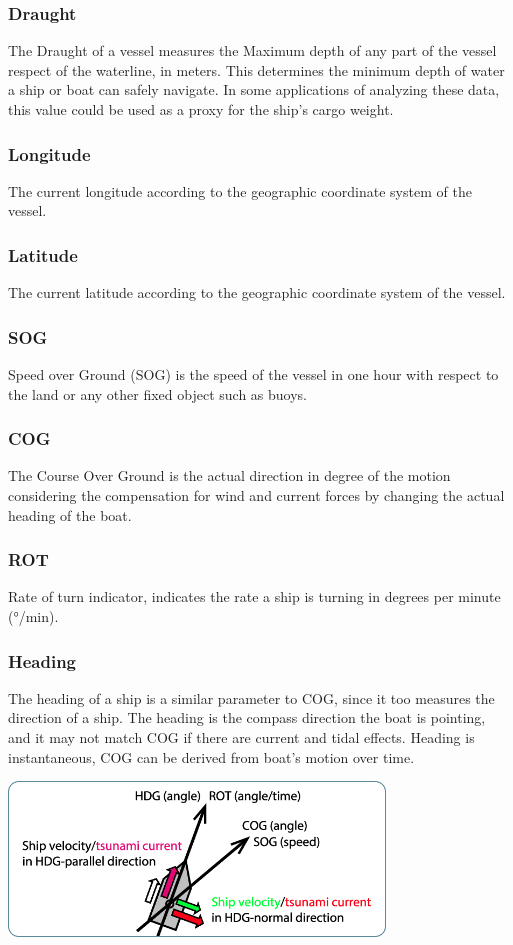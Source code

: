 \subsubsection{Draught}
    The Draught of a vessel measures the Maximum depth of any part of the vessel respect of the waterline, in meters. This determines the minimum depth of water a ship or boat can safely navigate. In some applications of analyzing these data, this value could be used as a proxy for the ship's cargo weight.
\subsubsection{Longitude}
    The current longitude according to the geographic coordinate system of the vessel.
\subsubsection{Latitude}
    The current latitude according to the geographic coordinate system of the vessel.
\subsubsection{SOG}
    Speed over Ground (SOG) is the speed of the vessel in one hour with respect to the land or any other fixed object such as buoys.
\subsubsection{COG}
    The Course Over Ground is the actual direction in degree of the motion considering the compensation for wind and current forces by changing the actual heading of the boat.
\subsubsection{ROT}
    Rate of turn indicator, indicates the rate a ship is turning in degrees per minute (°/min).
\subsubsection{Heading}
    The heading of a ship is a similar parameter to COG, since it too measures the direction of a ship. The heading is the compass direction the boat is pointing, and it may not match COG if there are current and tidal effects. Heading is instantaneous, COG can be derived from boat's motion over time.
    \\
    \begin{center}
    \includegraphics[width=10cm]{Images/appendices/cog-sog.png}
    \end{center}
    
